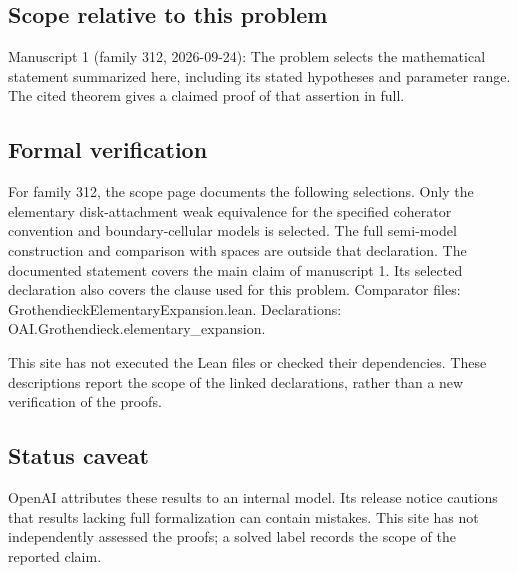 \documentclass[11pt]{article}
\begin{document}
\subsection{Scope relative to this problem}
Manuscript 1 (family 312, 2026-09-24): The problem selects the mathematical statement summarized here, including its stated hypotheses and parameter range. The cited theorem gives a claimed proof of that assertion in full.

\subsection{Formal verification}
For family 312, the scope page documents the following selections. Only the elementary disk-attachment weak equivalence for the specified coherator convention and boundary-cellular models is selected. The full semi-model construction and comparison with spaces are outside that declaration. The documented statement covers the main claim of manuscript 1. Its selected declaration also covers the clause used for this problem. Comparator files: GrothendieckElementaryExpansion.lean. Declarations: OAI.Grothendieck.elementary\_expansion.

This site has not executed the Lean files or checked their dependencies. These descriptions report the scope of the linked declarations, rather than a new verification of the proofs.

\subsection{Status caveat}
OpenAI attributes these results to an internal model. Its release notice cautions that results lacking full formalization can contain mistakes. This site has not independently assessed the proofs; a solved label records the scope of the reported claim.
\end{document}
